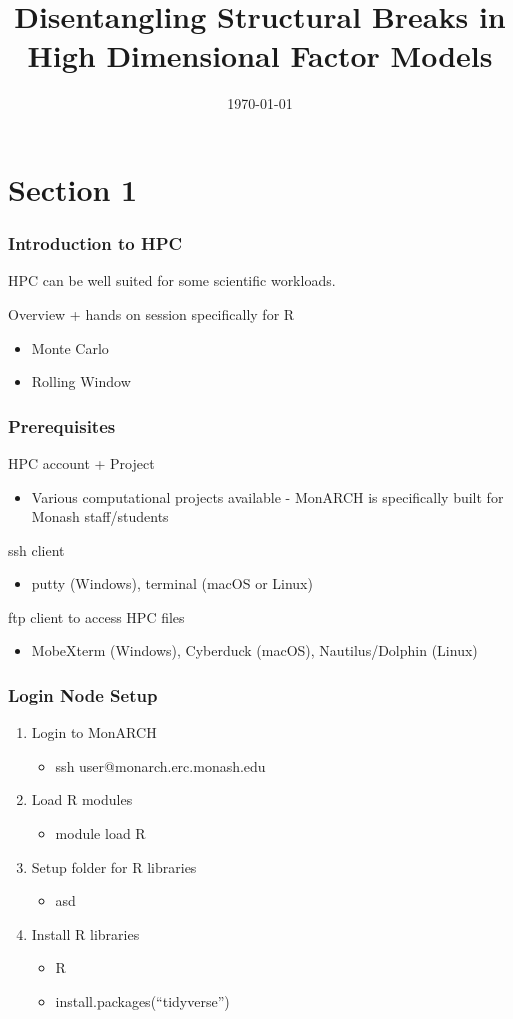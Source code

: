 \documentclass[aspectratio=169,notheorems]{beamer}
\title{Disentangling Structural Breaks in High Dimensional Factor Models}
\author[Koo, Wong and Zhong]{%
  \texorpdfstring{%
    \begin{columns}
      \column{.3333\linewidth}
      \centering
      Bonsoo Koo \\ Monash University
      \column{.3333\linewidth}
      \centering
      Benjamin Wong \\ Monash University
      \column{.3333\linewidth}
      \centering
      Ze Yu Zhong* \\ Monash University
    \end{columns}
 }
 {Author 1, Author 2, Author 3}
}
\date{\today}
\theoremstyle{plain}
\theoremstyle{plain}
\numberwithin{equation}{section}
\begin{document}
\section{Section 1}
\begin{frame}
\frametitle{Introduction to HPC}
HPC can be well suited for some scientific workloads.

Overview + hands on session specifically for R
\begin{itemize}
\item Monte Carlo
\item Rolling Window
\end{itemize}
\end{frame}

\begin{frame}
\frametitle{Prerequisites}
HPC account + Project
\begin{itemize}
\item Various computational projects available - MonARCH is specifically built for Monash staff/students
\end{itemize}
ssh client
\begin{itemize}
\item putty (Windows), terminal (macOS or Linux)
\end{itemize}
ftp client to access HPC files
\begin{itemize}
\item MobeXterm (Windows), Cyberduck (macOS), Nautilus/Dolphin (Linux)
\end{itemize}
\end{frame}

\begin{frame}
\frametitle{Login Node Setup}
\begin{enumerate}
\item Login to MonARCH
	\begin{itemize}
	\item ssh user@monarch.erc.monash.edu
	\end{itemize}
\item Load R modules
	\begin{itemize}
	\item module load R
	\end{itemize}
\item Setup folder for R libraries
	\begin{itemize}
	\item asd
	\end{itemize}
\item Install R libraries
	\begin{itemize}
	\item R
	\item install.packages(``tidyverse'')
	\end{itemize}
\end{enumerate}
\end{frame}
\end{document}

